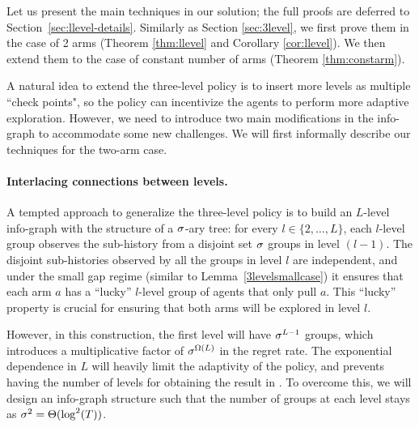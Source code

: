 Let us present the main techniques in our solution; the full proofs are deferred to Section~\ref{sec:llevel-details}. Similarly as Section \ref{sec:3level}, we
first prove them in the case of 2 arms (Theorem \ref{thm:llevel} and
Corollary \ref{cor:llevel}). We then extend them to the case of
constant number of arms (Theorem \ref{thm:constarm}).

A natural idea to extend the three-level policy is to insert more
levels as multiple ``check points", so the policy can incentivize the
agents to perform more adaptive exploration. However, we need to
introduce two main modifications in the info-graph to accommodate
some new challenges. We will first informally describe our techniques
for the two-arm case.




\paragraph{Interlacing connections between levels.}A tempted approach
to generalize the three-level policy is to build an $L$-level
info-graph with the structure of a $\sigma$-ary tree: for every
$l\in \{2, \ldots , L\}$, each $l$-level group observes the
sub-history from a disjoint set $\sigma$ groups in level $(l-1)$. The
disjoint sub-histories observed by all the groups in level $l$ are
independent, and under the small gap regime (similar to
Lemma~\ref{3levelsmallcase}) it ensures that each arm $a$ has a
``lucky'' $l$-level group of agents that only pull $a$. This ``lucky''
property is crucial for ensuring that both arms will be explored in
level $l$.

However, in this construction, the first level will have $\sigma^{L-1}$
groups, which introduces a multiplicative factor of $\sigma^{\Omega(L)}$
in the regret rate. The exponential dependence in $L$ will heavily
limit the adaptivity of the policy, and prevents having the number of
levels for obtaining the result in . To overcome
this, we will design an info-graph structure such that the number of
groups at each level stays as $\sigma^2 = \Theta(\log^2(T))$.


